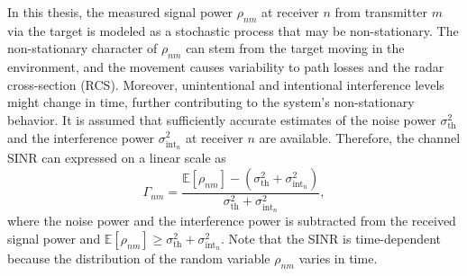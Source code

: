 \documentclass[english, 12pt, a4paper, elec, utf8, a-1b, online]{aaltothesis}
\newcommand{\E}[1]{\mathbb{E}\left[ #1 \right]}
\newcommand{\thnoise}{\sigma^2_{\text{th}}}
\newcommand{\eintnoise}{\sigma^2_{\text{int}_{n}}}
\newcommand{\esinrexp}{\Gamma_{nm}}
\newcommand{\esp}{\rho_{nm}}
\begin{document}
In this thesis, the measured signal power $\esp$ at receiver $n$ from transmitter $m$ via the target is modeled as a stochastic process that may be non-stationary. 
The non-stationary character of $\esp$ can stem from the target moving in the environment, and 
the movement causes variability to path losses and the radar cross-section (RCS).
Moreover, unintentional and intentional interference levels might change in time, further contributing to the system's non-stationary behavior.
It is assumed that sufficiently accurate estimates of the noise power $\thnoise$ and the interference power $\eintnoise$ at receiver $n$ are available.
Therefore, the channel SINR can expressed on a linear scale as
\begin{equation}\label{eq:sinr}
     \esinrexp = \frac{\E{\esp} - (\thnoise + \eintnoise)}{\thnoise + \eintnoise },
\end{equation}
where the noise power and the interference power is subtracted from the received signal power and $\E{\esp} \geq \thnoise + \eintnoise$.
Note that the SINR is time-dependent because the distribution of the random variable $\esp$ varies in time. 
\end{document}
